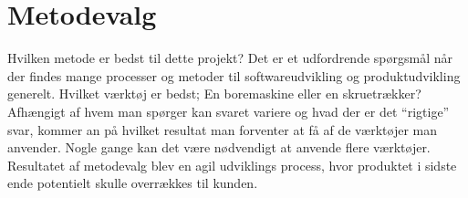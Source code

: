 \section{Metodevalg}\label{sec:valgafprocesmodel}
Hvilken metode er bedst til dette projekt? Det er et udfordrende spørgsmål når der findes mange processer 
og metoder til softwareudvikling og produktudvikling generelt. Hvilket værktøj er bedst; En boremaskine 
eller en skruetrækker? Afhængigt af hvem man spørger kan svaret variere og hvad der er det “rigtige” svar, 
kommer an på hvilket resultat man forventer at få af de værktøjer man anvender. Nogle gange kan det være nødvendigt at anvende flere værktøjer. \\

Resultatet af metodevalg blev en agil udviklings process, hvor produktet i sidste ende potentielt skulle overrækkes til kunden.